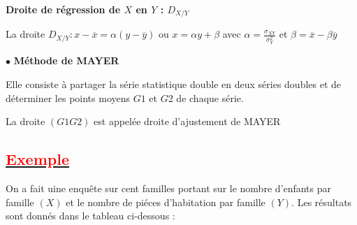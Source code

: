 \documentclass[12pt]{article}
\begin{document}
\textbf{Droite de régression de  $X$ en $Y$ : $D_{X/Y}$}

La droite  $D_{X/Y} :  x-\overline{x} =\alpha(y-\overline{y})$  ou $x = \alpha y +\beta $        
avec $\alpha = \frac{\sigma_{XY}}{\sigma_{Y}^{2}}$ et $\beta = \overline{x}-\beta \overline{y}$

$\bullet$ \textbf{Méthode de MAYER} 

Elle consiste à partager la série statistique double en deux séries doubles et de déterminer les points moyens $G1$ et $G2$ de chaque série.

La droite $(G1G2)$ est appelée droite d’ajustement de MAYER

\subsection*{\underline{\textbf{\textcolor{red}{Exemple}}}}
On  a fait uine enquête sur cent familles portant sur le nombre d’enfants par famille $(X)$ et le nombre de piéces d’habitation par famille $(Y)$.
Les résultats sont donnés dans le tableau ci-dessous :\\
\end{document}
